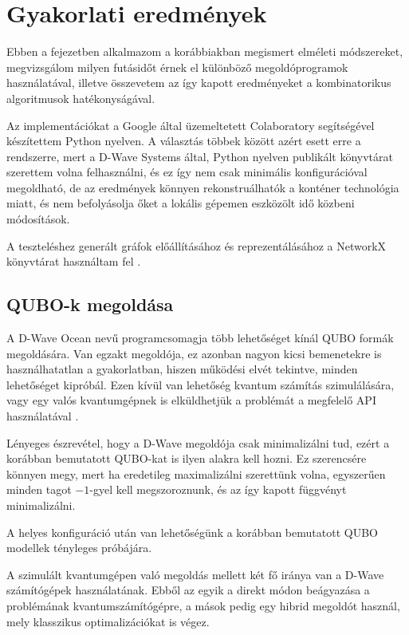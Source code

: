 
\chapter{Gyakorlati eredmények}
Ebben a fejezetben alkalmazom a korábbiakban megismert elméleti módszereket, megvizsgálom milyen futásidőt érnek el különböző megoldóprogramok használatával, illetve összevetem az így kapott eredményeket a kombinatorikus algoritmusok hatékonyságával.

Az implementációkat a Google által üzemeltetett Colaboratory segítségével készítettem Python nyelven. A választás többek között azért esett erre a rendszerre, mert a D-Wave Systems által, Python nyelven publikált könyvtárat szerettem volna felhasználni, és ez így nem csak minimális konfigurációval megoldható, de az eredmények könnyen rekonstruálhatók a konténer technológia miatt, és nem befolyásolja őket a lokális gépemen eszközölt idő közbeni módosítások.

A teszteléshez generált gráfok előállításához és reprezentálásához a NetworkX könyvtárat használtam fel \cite{NetworkX}.

\section{QUBO-k megoldása}

A D-Wave Ocean nevű programcsomagja több lehetőséget kínál QUBO formák megoldására. Van egzakt megoldója, ez azonban nagyon kicsi bemenetekre is használhatatlan a gyakorlatban, hiszen működési elvét tekintve, minden lehetőséget kipróbál. Ezen kívül van lehetőség kvantum számítás szimulálására, vagy egy valós kvantumgépnek is elküldhetjük a problémát a megfelelő API használatával \cite{DWaveOcean}.

Lényeges észrevétel, hogy a D-Wave megoldója csak minimalizálni tud, ezért a korábban bemutatott QUBO-kat is ilyen alakra kell hozni. Ez szerencsére könnyen megy, mert ha eredetileg maximalizálni szerettünk volna, egyszerűen minden tagot $-1$-gyel kell megszoroznunk, és az így kapott függvényt minimalizálni.

A helyes konfiguráció után van lehetőségünk a korábban bemutatott QUBO modellek tényleges próbájára.

A szimulált kvantumgépen való megoldás mellett két fő iránya van a D-Wave számítógépek használatának. Ebből az egyik a direkt módon beágyazása a problémának kvantumszámítógépre, a mások pedig egy hibrid megoldót használ, mely klasszikus optimalizációkat is végez.

